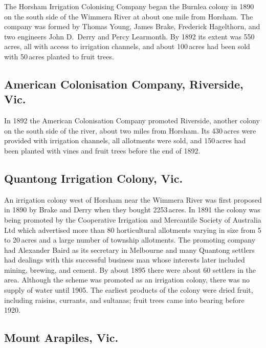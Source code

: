 The Horsham Irrigation Colonising Company began the Burnlea colony in
1890 on the south side of the Wimmera River at about one mile from
Horsham.  The company was formed by Thomas Young, James Brake,
Frederick Hagelthorn, and two engineers John D.~Derry and Percy
Learmonth.  By 1892 its extent was 550\,acres, all with access to
irrigation channels, and about 100\,acres had been sold with 50\,acres
planted to fruit trees.

\subsection*{American Colonisation Company, Riverside, Vic.}

In 1892 the American Colonisation Company promoted Riverside, another
colony on the south side of the river, about two miles from Horsham.
Its 430\,acres were provided with irrigation channels, all allotments
were sold, and 150\,acres had been planted with vines and fruit trees
before the end of 1892.

\subsection*{Quantong Irrigation Colony, Vic.}

An irrigation colony west of Horsham near the Wimmera River was first
proposed in 1890 by Brake and Derry when they bought 2253\,acres.  In
1891 the colony was being promoted by the Cooperative Irrigation and
Mercantile Society of Australia Ltd which advertised more than 80
horticultural allotments varying in size from 5 to 20\,acres and a
large number of township allotments.  The promoting company had
Alexander Baird as its secretary in Melbourne and many Quantong
settlers had dealings with this successful business man whose
interests later included mining, brewing, and cement.  By about 1895
there were about 60 settlers in the area.  Although the scheme was
promoted as an irrigation colony, there was no supply of water until
1905.  The earliest products of the colony were dried fruit, including
raisins, currants, and sultanas; fruit trees came into bearing before
1920.

\subsection*{Mount Arapiles, Vic.}

